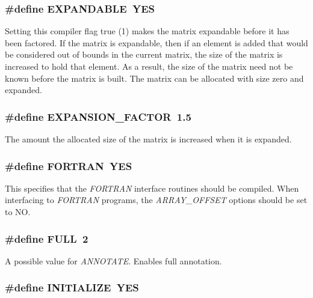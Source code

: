 \subsubsection{\setlength{\rightskip}{0pt plus 5cm}\#define EXPANDABLE\ YES}\label{spConfig_8h_a1}


Setting this compiler flag true (1) makes the matrix expandable before it has been factored. If the matrix is expandable, then if an element is added that would be considered out of bounds in the current matrix, the size of the matrix is increased to hold that element. As a result, the size of the matrix need not be known before the matrix is built. The matrix can be allocated with size zero and expanded. 
\subsubsection{\setlength{\rightskip}{0pt plus 5cm}\#define EXPANSION\_\-FACTOR\ 1.5}\label{spConfig_8h_a29}


The amount the allocated size of the matrix is increased when it is expanded. 
\subsubsection{\setlength{\rightskip}{0pt plus 5cm}\#define FORTRAN\ YES}\label{spConfig_8h_a19}


This specifies that the {\em FORTRAN} interface routines should be compiled. When interfacing to {\em FORTRAN} programs, the {\em ARRAY\_\-OFFSET} options should be set to NO. 
\subsubsection{\setlength{\rightskip}{0pt plus 5cm}\#define FULL\ 2}\label{spConfig_8h_a48}


A possible value for {\em ANNOTATE}. Enables full annotation. 
\subsubsection{\setlength{\rightskip}{0pt plus 5cm}\#define INITIALIZE\ YES}\label{spConfig_8h_a3}


